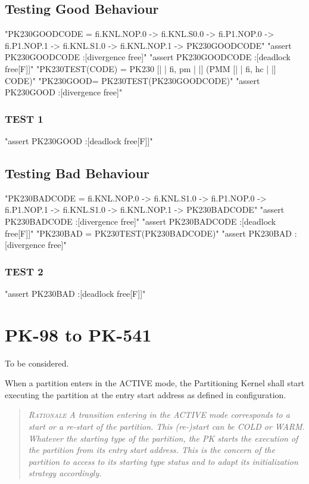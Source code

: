 \subsection{Testing Good Behaviour}

\begin{assert}
"PK230GOODCODE = fi.KNL.NOP.0 -> fi.KNL.S0.0  -> fi.P1.NOP.0  -> fi.P1.NOP.1  -> fi.KNL.S1.0  -> fi.KNL.NOP.1 -> PK230GOODCODE"
\also "assert PK230GOODCODE :[divergence free]"
\also "assert PK230GOODCODE :[deadlock free[F]]"
\also "PK230TEST(CODE) = PK230 [| {| fi, pm |} |] (PMM [| {| fi, hc |} |] CODE)"
\also "PK230GOOD= PK230TEST(PK230GOODCODE)"
\also "assert PK230GOOD :[divergence free]"
\end{assert}

\subsubsection{TEST 1}

\begin{assert}
"assert PK230GOOD :[deadlock free[F]]"
\end{assert}

\subsection{Testing Bad Behaviour}

\begin{assert}
"PK230BADCODE = fi.KNL.NOP.0 -> fi.KNL.S1.0 -> fi.P1.NOP.0 -> fi.P1.NOP.1 -> fi.KNL.S1.0 -> fi.KNL.NOP.1 -> PK230BADCODE"
\also "assert PK230BADCODE :[divergence free]"
\also "assert PK230BADCODE :[deadlock free[F]]"
\also "PK230BAD = PK230TEST(PK230BADCODE)"
\also "assert PK230BAD :[divergence free]"
\end{assert}


\subsubsection{TEST 2}
\begin{assert}
"assert PK230BAD :[deadlock free[F]]"
\end{assert}

\section{PK-98 to PK-541}

To be considered.

When a partition enters in the ACTIVE mode, the Partitioning Kernel shall start executing the partition at the entry start address as defined in configuration.
\begin{quote}\it
\textsc{Rationale}
A transition entering in the ACTIVE mode corresponds to a start or a re-start of the partition. This (re-)start can be COLD or WARM. Whatever the starting type of the partition, the PK starts the execution of the partition from its entry start address. This is the concern of the partition to access to its starting type status and to adapt its initialization strategy accordingly.
\end{quote}

